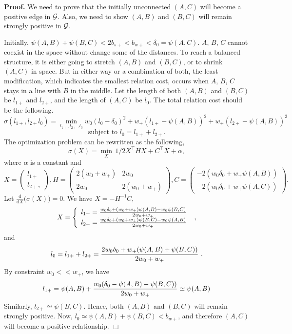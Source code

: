 {\bf Proof.} We need to prove that the initially unconnected $(A,C)$ will become a positive edge in $\cal G$. Also, we need to show $(A,B)$ and $(B,C)$ will remain strongly positive in $\cal G$. 

Initially, $\psi{(A,B)} + \psi{(B,C)} < 2b_{s+}<b_{w+}<\delta_{0} =\psi{(A,C)}$. $A$, $B$, $C$ cannot coexist in the space without change some of the distances. To reach a balanced structure, it is either going to stretch $(A,B)$ and $(B,C)$, or to shrink $(A,C)$ in space. But in either way or a combination of both, the least modification, which indicates the smallest relation cost, occurs when $A$, $B$, $C$ stays in a line with $B$ in the middle. 
Let the length of both $(A,B)$ and $(B,C)$ be $l_{1+}$ and $l_{2+}$, and the length of $(A,C)$ be $l_{0}$. The total relation cost should be the following.
\[
\sigma(l_{1+}, l_{2+} l_{0}) = \min_{l_{1+},l_{2+}, l_{0}} w_{0}(l_{0}-\delta_{0})^2 + w_{+}(l_{1+}-\psi{(A,B)})^2+ w_{+}(l_{2+}-\psi{(A,B)})^2
\]
\[
\text{subject to  } l_{0}=l_{1+}+l_{2+}.
\]
The optimization problem can be rewritten as the following,
\[
\sigma(X)= \min_{X}\, 1/2X^{\top}HX+C^{\top}X+ \alpha,
\]
where $\alpha$ is a constant and
\[
 X =
 \begin{pmatrix}
  l_{1+}  \\
  l_{2+},
 \end{pmatrix},
  H =
 \begin{pmatrix}
  2(w_{0}+w_{+}) & 2w_{0}\\
  2w_{0} & 2(w_{0}+w_{+})
 \end{pmatrix},
  C =
 \begin{pmatrix}
  -2(w_{0}\delta_{0}+w_{+}\psi(A,B))  \\
  -2(w_{0}\delta_{0}+w_{+}\psi(A,C))
 \end{pmatrix}.
\]
Let  $\frac{\mathrm d}{\mathrm d X} \big( \sigma(X) \big)=0$. We have $X=-H^{-1}C$,
\[
  X=\left\{ 
  \begin{array}{l l}
    {l_{1+}} = {{w_{0}\delta_{0}+(w_{0}+w_{+})\psi(A,B)-w_{0}\psi(B,C)} \over {2w_{0}+w_{+}}}\\
    {l_{2+}}={{w_{0}\delta_{0}+(w_{0}+w_{+})\psi(B,C)-w_{0}\psi(A,B)} \over {2w_{0}+w_{+}}}
  \end{array} \right.\text{ ,}
\]
and
\[
l_{0}=l_{1+}+l_{2+} ={{2w_{0}\delta_{0}+w_{+}(\psi(A,B)+\psi(B,C))} \over {2w_{0}+w_{+}}} \text{ .}
\]
By constraint $w_{0}<<w_{+}$, we have
\[
{l_{1+}}=\psi(A,B)+{{w_{0}(\delta_{0}-\psi(A,B)-\psi(B,C))} \over {2w_{0}+w_{+}}} \simeq \psi(A,B)
\]
Similarly, ${l_{2+}} \simeq \psi(B,C)$. Hence, both $(A,B)$ and $(B,C)$ will remain strongly positive. Now, $l_{0} \simeq \psi(A,B)+ \psi(B,C) < b_{w+}$, and therefore $(A,C)$ will become a positive relationship. $\Box$\\

